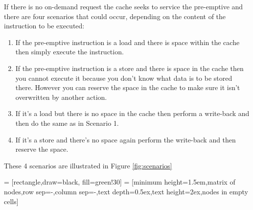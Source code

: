 If there is no on-demand request the cache seeks to service the pre-emptive and there are four scenarios that could occur, depending on the content of the instruction to be executed:

\begin{enumerate}[label=\textbf{Scenario \arabic*:}, align=left, leftmargin=*,labelindent=16pt]
	\item If the pre-emptive instruction is a load and there is space within the cache then simply execute the instruction.
	\item If the pre-emptive instruction is a store and there is space in the cache then you cannot execute it because you don't know what data is to be stored there. However you can reserve the space in the cache to make sure it isn't overwritten by another action.
	\item If it's a load but there is no space in the cache then perform a write-back and then do the same as in Scenario 1.
	\item If it's a store and there's no space again perform the write-back and then reserve the space.
\end{enumerate}

These 4 scenarios are illustrated in Figure \ref{fig:scenarios}

 = [rectangle,draw=black, fill=green!30]
 = [minimum height=1.5em,matrix of nodes,row sep=-\pgflinewidth,column sep=-\pgflinewidth,text depth=0.5ex,text height=2ex,nodes in empty cells]


